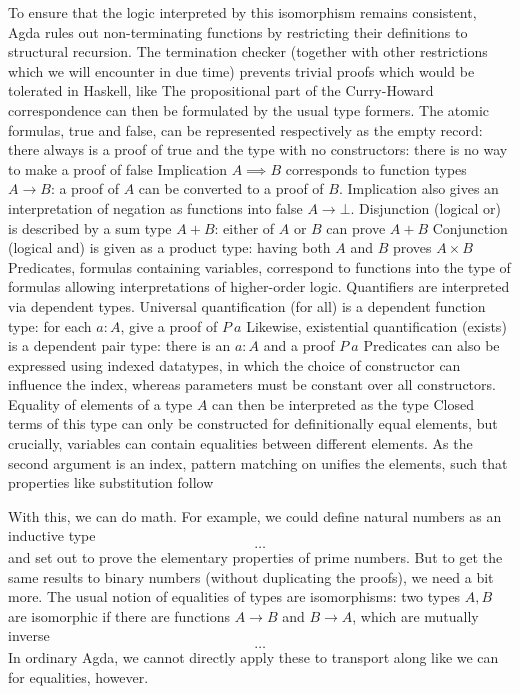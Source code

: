 To ensure that the logic interpreted by this isomorphism remains consistent, Agda rules out non-terminating functions by restricting their definitions to structural recursion. The termination checker (together with other restrictions which we will encounter in due time) prevents trivial proofs which would be tolerated in Haskell, like
The propositional part of the Curry-Howard correspondence can then be formulated by the usual type formers. The atomic formulas, true and false, can be represented respectively as the empty record: there always is a proof  of true
and the type with no constructors: there is no way to make a proof of false
Implication $A \implies B$ corresponds to function types $A \to B$: a proof of $A$ can be converted to a proof of $B$. Implication also gives an interpretation of negation as functions into false $A \to \bot$. Disjunction (logical or) is described by a sum type $A + B$: either of $A$ or $B$ can prove $A + B$
Conjunction (logical and) is given as a product type: having both $A$ and $B$ proves $A \times B$
Predicates, formulas containing variables, correspond to functions into the type of formulas
allowing interpretations of higher-order logic. Quantifiers are interpreted via dependent types. Universal quantification (for all) is a dependent function type: for each $a : A$, give a proof of $P\ a$
Likewise, existential quantification (exists) is a dependent pair type: there is an $a : A$ and a proof $P\ a$
Predicates can also be expressed using indexed datatypes, in which the choice of constructor can influence the index, whereas parameters must be constant over all constructors. Equality of elements of a type $A$ can then be interpreted as the type
Closed terms of this type can only be constructed for definitionally equal elements, but crucially, variables can contain equalities between different elements. As the second argument is an index, pattern matching on  unifies the elements, such that properties like substitution follow

With this, we can do math. For example, we could define natural numbers as an inductive type
\[ \dots \]
and set out to prove the elementary properties of prime numbers. But to get the same results to binary numbers (without duplicating the proofs), we need a bit more. The usual notion of equalities of types are isomorphisms: two types $A, B$ are isomorphic if there are functions $A \to B$ and $B \to A$, which are mutually inverse 
\[ \dots \]
In ordinary Agda, we cannot directly apply these to transport along like we can for equalities, however.

